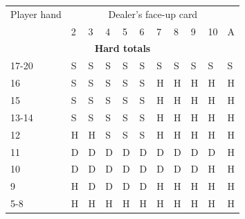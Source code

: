 \documentclass[conference]{IEEEtran}
\begin{document}
\begin{table}[ht]
\begin{tabular}{|l|l|l|l|l|l|l|l|l|l|l|}
{Player hand} & \multicolumn{10}{c|}{Dealer's face-up card}     \\ \cline{2-11} 
                             & 2 & 3 & 4 & 5 & 6 & 7 & 8 & 9 & 10 & A \\ \hline \hline
\multicolumn{11}{|c|}{\textbf{Hard totals}}                           \\ \hline
17-20       								 & \cellcolor{red!75}S & \cellcolor{red!75}S & \cellcolor{red!75}S & \cellcolor{red!75}S & \cellcolor{red!75}S & \cellcolor{red!75}S & \cellcolor{red!75}S & \cellcolor{red!75}S & \cellcolor{red!75}S & \cellcolor{red!75}S  \\ \hline
16                           & \cellcolor{red!75}S & \cellcolor{red!75}S & \cellcolor{red!75}S & \cellcolor{red!75}S & \cellcolor{red!75}S & \cellcolor{green!50}H & \cellcolor{green!50}H & \cellcolor{green!50}H & \cellcolor{green!50}H & \cellcolor{green!50}H  \\ \hline
15                           & \cellcolor{red!75}S & \cellcolor{red!75}S & \cellcolor{red!75}S & \cellcolor{red!75}S & \cellcolor{red!75}S & \cellcolor{green!50}H & \cellcolor{green!50}H & \cellcolor{green!50}H & \cellcolor{green!50}H & \cellcolor{green!50}H  \\ \hline
13-14                        & \cellcolor{red!75}S & \cellcolor{red!75}S & \cellcolor{red!75}S & \cellcolor{red!75}S & \cellcolor{red!75}S & \cellcolor{green!50}H & \cellcolor{green!50}H & \cellcolor{green!50}H & \cellcolor{green!50}H & \cellcolor{green!50}H  \\ \hline
12                           & \cellcolor{green!50}H & \cellcolor{green!50}H & \cellcolor{red!75}S & \cellcolor{red!75}S & \cellcolor{red!75}S & \cellcolor{green!50}H & \cellcolor{green!50}H & \cellcolor{green!50}H & \cellcolor{green!50}H & \cellcolor{green!50}H  \\ \hline
11                           & \cellcolor{blue!25}D & \cellcolor{blue!25}D & \cellcolor{blue!25}D & \cellcolor{blue!25}D & \cellcolor{blue!25}D & \cellcolor{blue!25}D & \cellcolor{blue!25}D & \cellcolor{blue!25}D & \cellcolor{blue!25}D & \cellcolor{green!50}H  \\ \hline
10                           & \cellcolor{blue!25}D & \cellcolor{blue!25}D & \cellcolor{blue!25}D & \cellcolor{blue!25}D & \cellcolor{blue!25}D & \cellcolor{blue!25}D & \cellcolor{blue!25}D & \cellcolor{blue!25}D & \cellcolor{green!50}H & \cellcolor{green!50}H \\ \hline
9                            & \cellcolor{green!50}H & \cellcolor{blue!25}D & \cellcolor{blue!25}D & \cellcolor{blue!25}D & \cellcolor{blue!25}D & \cellcolor{green!50}H & \cellcolor{green!50}H & \cellcolor{green!50}H & \cellcolor{green!50}H & \cellcolor{green!50}H  \\ \hline
5-8                          & \cellcolor{green!50}H & \cellcolor{green!50}H & \cellcolor{green!50}H & \cellcolor{green!50}H & \cellcolor{green!50}H & \cellcolor{green!50}H & \cellcolor{green!50}H & \cellcolor{green!50}H & \cellcolor{green!50}H & \cellcolor{green!50}H \\ \hline \hline


\end{tabular}
\end{table}
\end{document}
